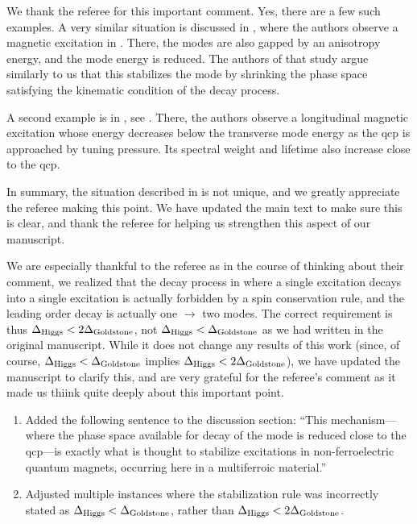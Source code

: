 We thank the referee for this important comment.
Yes, there are a few such examples.
A very similar situation is discussed in \citet{hong_higgs_2017}, where the authors observe a \higgs magnetic excitation in .
There, the \goldstone modes are also gapped by an anisotropy energy, and the \higgs mode energy is reduced.
The authors of that study argue similarly to us that this stabilizes the \higgs mode by shrinking the phase space satisfying the kinematic condition of the decay process.

A second example is in , see \citet{ruegg_quantum_2008}.
There, the authors observe a longitudinal magnetic excitation whose energy decreases below the transverse mode energy as the \gls{qcp} is approached by tuning pressure.
Its spectral weight and lifetime also increase close to the \gls{qcp}.

In summary, the situation described in  is not unique, and we greatly appreciate the referee making this point.
We have updated the main text to make sure this is clear, and thank the referee for helping us strengthen this aspect of our manuscript.

We are especially thankful to the referee as in the course of thinking about their comment, we realized that the decay process in  where a single \higgs excitation decays into a single \goldstone excitation is actually forbidden by a spin conservation rule, and the leading order decay is actually one \higgs $\rightarrow$ two \goldstone modes.
The correct requirement is thus $\Delta_\mathrm{Higgs} < 2\Delta_\mathrm{Goldstone}$, not $\Delta_\mathrm{Higgs} < \Delta_\mathrm{Goldstone}$ as we had written in the original manuscript.
While it does not change any results of this work (since, of course, $\Delta_\mathrm{Higgs} < \Delta_\mathrm{Goldstone}$ implies $\Delta_\mathrm{Higgs} < 2\Delta_\mathrm{Goldstone}$), we have updated the manuscript to clarify this, and are very grateful for the referee's comment as it made us thiink quite deeply about this important point.

\begin{changesmade}
\begin{enumerate}
\item Added the following sentence to the discussion section: ``This mechanism---where the phase space available for decay of the \higgs mode is reduced close to the \gls{qcp}---is exactly what is thought to stabilize \higgs excitations in non-ferroelectric quantum magnets\citep{hong_higgs_2017}, occurring here in a multiferroic material.''
\item Adjusted multiple instances where the stabilization rule was incorrectly stated as $\Delta_\mathrm{Higgs} < \Delta_\mathrm{Goldstone}$, rather than $\Delta_\mathrm{Higgs} < 2\Delta_\mathrm{Goldstone}$.
\end{enumerate}
\end{changesmade}

